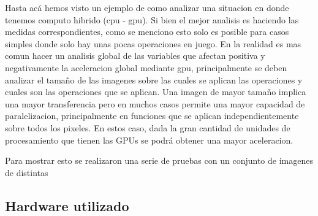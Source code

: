\documentclass[a4paper,10pt]{report}
\begin{document}
Hasta acá hemos visto un ejemplo de como analizar una situacion en donde tenemos computo hibrido (cpu - gpu).
Si bien el mejor analisis es haciendo las medidas correspondientes, como se menciono esto solo es posible para casos simples donde solo hay unas pocas operaciones en juego.
En la realidad es mas comun hacer un analisis global de las variables que afectan positiva y negativamente la aceleracion global mediante gpu, principalmente se deben analizar el tamaño de las imagenes 
sobre las cuales se aplican las operaciones y cuales son las operaciones que se aplican. Una imagen de mayor tamaño implica una mayor transferencia pero en muchos casos permite una mayor capacidad de paralelizacion, 
principalmente en funciones que se aplican independientemente sobre todos los pixeles. En estos caso, dada la gran cantidad de unidades de procesamiento que tienen las GPUs se podrá obtener una mayor aceleracion.

Para mostrar esto se realizaron una serie de pruebas con un conjunto de imagenes de distintas 

\begin{figure}[!ht]
\begin{center}
\end{center}
\label{sizeevstime}
\end{figure}






\subsection{Hardware utilizado}
\end{document}
